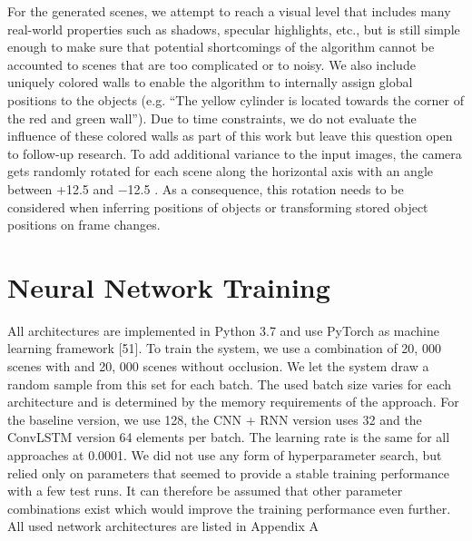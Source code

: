 For the generated scenes, we attempt to reach a visual level that includes many real-world properties
such as shadows, specular highlights, etc., but is still simple enough to make sure that potential
shortcomings of the algorithm cannot be accounted to scenes that are too complicated or to noisy.
We also include uniquely colored walls to enable the algorithm to internally assign global positions to
the objects (e.g. “The yellow cylinder is located towards the corner of the red and green wall”). Due
to time constraints, we do not evaluate the inﬂuence of these colored walls as part of this work but
leave this question open to follow-up research. To add additional variance to the input images, the
camera gets randomly rotated for each scene along the horizontal axis with an angle between +12.5
and −12.5
. As a consequence, this rotation needs to be considered when inferring positions of objects
or transforming stored object positions on frame changes.

\section{Neural Network Training}
All architectures are implemented in Python 3.7 and use PyTorch as machine learning framework
[51]. To train the system, we use a combination of 20, 000 scenes with and 20, 000 scenes without
occlusion. We let the system draw a random sample from this set for each batch. The used batch
size varies for each architecture and is determined by the memory requirements of the approach. For
the baseline version, we use 128, the CNN + RNN version uses 32 and the ConvLSTM version 64
elements per batch. The learning rate is the same for all approaches at 0.0001. We did not use any
form of hyperparameter search, but relied only on parameters that seemed to provide a stable training
performance with a few test runs. It can therefore be assumed that other parameter combinations exist
which would improve the training performance even further. All used network architectures are listed
in Appendix A

